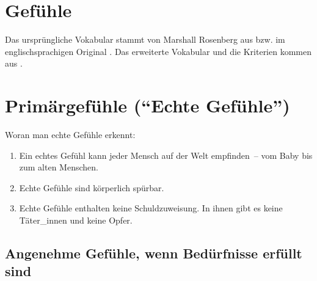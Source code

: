 \section{Gefühle}

Das ursprüngliche Vokabular stammt von Marshall Rosenberg aus \cite[S. 216]{gfk-rosenberg} bzw. im englischsprachigen Original \cite[S. 210]{nvc-rosenberg}. Das erweiterte Vokabular und die Kriterien kommen aus \cite[S. 56f]{gfk-fuer-dummies}.


\section{Primärgefühle ("`Echte Gefühle"')}

Woran man echte Gefühle erkennt:

\begin{enumerate}
 \item Ein echtes Gefühl kann jeder Mensch auf der Welt empfinden~-- vom Baby bis zum alten Menschen.
 \item Echte Gefühle sind körperlich spürbar.
 \item Echte Gefühle enthalten keine Schuldzuweisung. In ihnen gibt es keine Täter\_innen und keine Opfer.
\end{enumerate}

\subsection{Angenehme Gefühle, wenn Bedürfnisse erfüllt sind}

